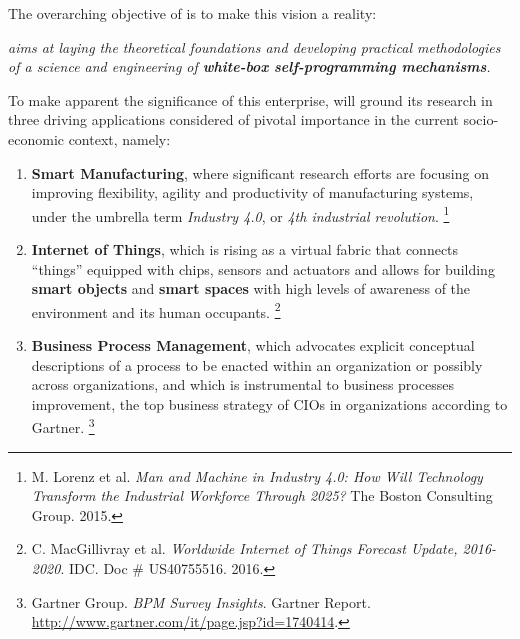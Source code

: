 The overarching objective of \project 
is to make this vision a reality: %

\begin{framed}\textit{
\project aims at laying the theoretical foundations and developing practical 
methodologies of a science and engineering of \textbf{white-box self-programming mechanisms}. 
}
\end{framed}


To make apparent the significance of this enterprise, \project will
ground its research in three driving applications  considered of pivotal
importance in the current socio-economic context, namely:
\begin{enumerate}
\item  \textbf{Smart Manufacturing}, where significant research efforts are focusing on
improving flexibility, agility and productivity of manufacturing
systems, under the umbrella term \emph{Industry 4.0}, or \emph{4th industrial
revolution}.%
\footnote{M. Lorenz et al. \textit{Man and Machine in Industry 4.0: How Will Technology Transform the Industrial Workforce Through 2025? }The Boston Consulting Group. 2015.}

\item \textbf{Internet of Things}, which is rising as a
virtual fabric that connects ``things''
equipped with chips, sensors and actuators and allows for building
\textbf{smart objects}
and \textbf{smart spaces} with high levels of awareness of the environment and its human occupants.%
\footnote{C. MacGillivray et al. \textit{Worldwide Internet of Things Forecast Update, 2016-2020}. IDC. Doc \# US40755516. 2016.}

\item \textbf{Business Process Management}, which advocates explicit
  conceptual descriptions of a process to be enacted within an
  organization or possibly across organizations, and which is
  instrumental to business processes improvement, the top business
  strategy of CIOs in organizations according to
  Gartner. %
\footnote{Gartner Group. \textit{BPM Survey Insights}. Gartner Report. \url{http://www.gartner.com/it/page.jsp?id=1740414}.}
\end{enumerate}


